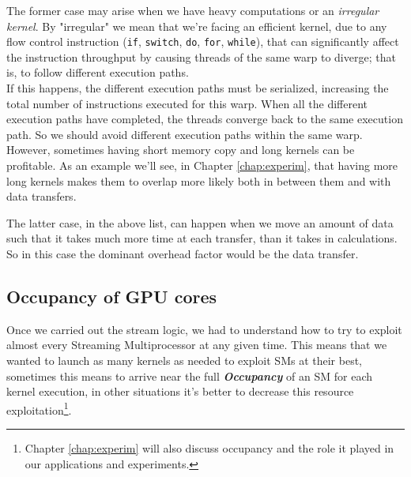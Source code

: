 	The former case may arise when we have heavy computations or an \textit{irregular kernel}.
	By "irregular" we mean that we're facing an efficient kernel, due to any flow control instruction (\texttt{if}, \texttt{switch}, \texttt{do}, \texttt{for}, \texttt{while}), that can significantly affect the instruction throughput by causing threads of the same warp to diverge; that is, to follow different execution paths.\\ 
	If this happens, the different execution paths must be serialized, increasing the total number of instructions executed for this warp. When all the different execution paths have completed, the threads converge back to the same execution path.	
	So we should avoid different execution paths within the same warp\cite{cudaguide}.\\
	However, sometimes having short memory copy and long kernels can be profitable. As an example we'll see, in Chapter \ref{chap:experim}, that having more long kernels makes them to overlap more likely both in between them and with data transfers.
	
	
	The latter case, in the above list, can happen when we move an amount of data such that it takes much more time at each transfer, than it takes in calculations. So in this case the dominant overhead factor would be the data transfer.	

	
	\subsection{Occupancy of GPU cores}
	Once we carried out the stream logic, we had to understand how to try to exploit almost every Streaming Multiprocessor at any given time.
	This means that we wanted to launch as many kernels as needed to exploit SMs at their best, sometimes this means to arrive near the full \textit{\textbf{Occupancy}} of an SM for each kernel execution, in other situations it's better to decrease this resource exploitation\footnote{Chapter \ref{chap:experim} will also discuss occupancy and the role it played in our applications and experiments.}.
	
